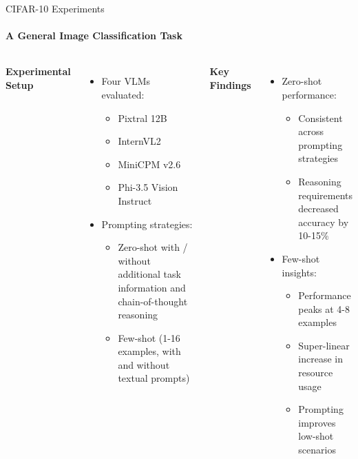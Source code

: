 \begin{frame}{CIFAR-10 Experiments}
\framesubtitle{A General Image Classification Task}
  \vspace{-1em}
  \begin{columns}[T]
    \column{\customcolumnwidth}
      \textbf{Experimental Setup}
      \begin{itemize}
        \item Four VLMs evaluated:
        \begin{itemize}
          \item Pixtral 12B
          \item InternVL2
          \item MiniCPM v2.6
          \item Phi-3.5 Vision Instruct
        \end{itemize}
        \item Prompting strategies:
        \begin{itemize}
          \item Zero-shot with / without additional task information and chain-of-thought reasoning
          \item Few-shot (1-16 examples, with and without textual prompts)
        \end{itemize}
      \end{itemize}
    \column{\customcolumnwidth}
      \textbf{Key Findings}
      \begin{itemize}
        \item Zero-shot performance:
        \begin{itemize}
          \item Consistent across prompting strategies
          \item Reasoning requirements decreased accuracy by 10-15\%
        \end{itemize}
        \item Few-shot insights:
        \begin{itemize}
          \item Performance peaks at 4-8 examples
          \item Super-linear increase in resource usage
          \item Prompting improves low-shot scenarios
        \end{itemize}
      \end{itemize}
  \end{columns}
\end{frame}

